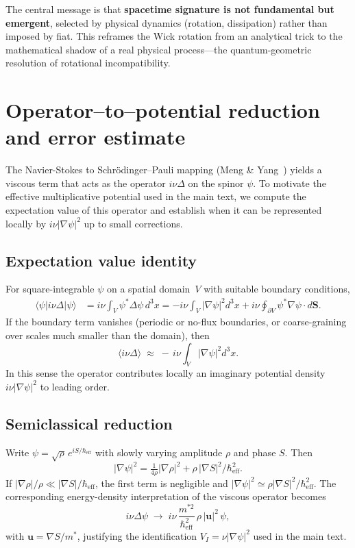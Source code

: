 \documentclass[11pt]{article}
\begin{document}
The central message is that \textbf{spacetime signature is not fundamental but 
emergent}, selected by physical dynamics (rotation, dissipation) rather than imposed 
by fiat. This reframes the Wick rotation from an analytical trick to the mathematical 
shadow of a real physical process---the quantum-geometric resolution of rotational 
incompatibility.




\appendix
\section{Operator--to--potential reduction and error estimate}
\label{app:operator-to-potential}

The Navier-Stokes to Schr\"odinger--Pauli mapping (Meng \& Yang~\cite{MengYang2024}) yields a viscous term that acts as the operator $i\nu\Delta$ on the spinor $\psi$.
To motivate the effective multiplicative potential used in the main text, we compute the expectation value of this operator and establish when it can be represented locally by $i\nu|\nabla\psi|^2$ up to small corrections.

\subsection*{Expectation value identity}
For square-integrable $\psi$ on a spatial domain~$V$ with suitable boundary conditions,
\begin{align}
    \langle \psi | i\nu\Delta | \psi\rangle
    &= i\nu \!\int_V \psi^* \Delta \psi \, d^3x
       = -i\nu \!\int_V |\nabla\psi|^2 d^3x
       + i\nu \!\oint_{\partial V} \psi^* \nabla\psi\!\cdot\! d\mathbf S .
\end{align}
If the boundary term vanishes (periodic or no-flux boundaries, or coarse-graining over scales much smaller than the domain), then
\begin{equation}
    \langle i\nu\Delta \rangle \;\approx\; -\,i\nu \!\int_V |\nabla\psi|^2 d^3x .
\end{equation}
In this sense the operator contributes locally an imaginary potential density $i\nu|\nabla\psi|^2$ to leading order.

\subsection*{Semiclassical reduction}
Write $\psi=\sqrt{\rho}\,e^{iS/\hbar_{\mathrm{eff}}}$ with slowly varying amplitude $\rho$ and phase $S$.
Then
\[
|\nabla\psi|^2
= \tfrac{1}{4\rho}|\nabla\rho|^2
+ \rho\,|\nabla S|^2/\hbar_{\mathrm{eff}}^2 .
\]
If $|\nabla\rho|/\rho\ll|\nabla S|/\hbar_{\mathrm{eff}}$, the first term is negligible and
$|\nabla\psi|^2\simeq \rho|\nabla S|^2/\hbar_{\mathrm{eff}}^2$.
The corresponding energy-density interpretation of the viscous operator becomes
\begin{equation}
    i\nu\Delta\psi \;\longrightarrow\; i\nu\,\frac{m^{*2}}{\hbar_{\mathrm{eff}}^2}\,\rho\,|\mathbf u|^2\,\psi ,
\end{equation}
with $\mathbf u=\nabla S/m^*$, justifying the identification $V_I=\nu|\nabla\psi|^2$ used in the main text.
\end{document}
